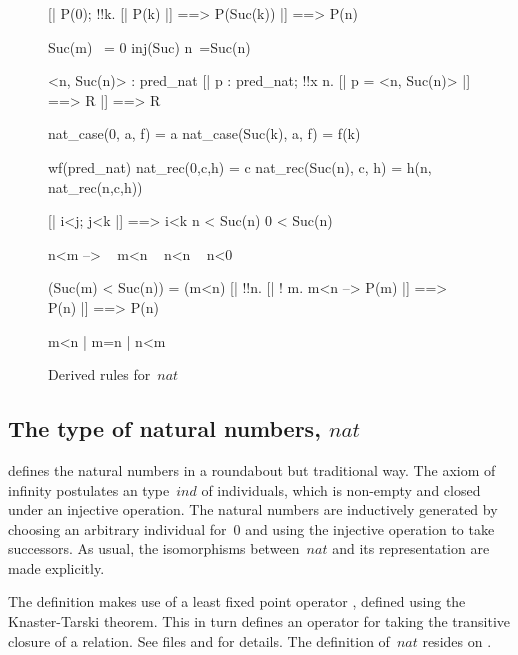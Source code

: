 \begin{figure} \makeatother
\begin{ttbox}
     [| P(0); !!k. [| P(k) |] ==> P(Suc(k)) |]  ==> P(n)

   Suc(m) ~= 0
        inj(Suc)
    n~=Suc(n)

      <n, Suc(n)> : pred_nat
    [| p : pred_nat;  !!x n. [| p = <n, Suc(n)> |] ==> R |] ==> R

     nat_case(0, a, f) = a
   nat_case(Suc(k), a, f) = f(k)

    wf(pred_nat)
      nat_rec(0,c,h) = c
    nat_rec(Suc(n), c, h) = h(n, nat_rec(n,c,h))

     [| i<j;  j<k |] ==> i<k
          n < Suc(n)
  0 < Suc(n)

   n<m --> ~ m<n 
  ~ n<n
      ~ n<0

    (Suc(m) < Suc(n)) = (m<n)
    [| !!n. [| ! m. m<n --> P(m) |] ==> P(n) |]  ==>  P(n)

    m<n | m=n | n<m
\end{ttbox}
\caption{Derived rules for~$nat$} \label{hol-nat2}
\end{figure}


\subsection{The type of natural numbers, $nat$}
{\HOL} defines the natural numbers in a roundabout but traditional way.
The axiom of infinity postulates an type~$ind$ of individuals, which is
non-empty and closed under an injective operation.  The natural numbers are
inductively generated by choosing an arbitrary individual for~0 and using
the injective operation to take successors.  As usual, the isomorphisms
between~$nat$ and its representation are made explicitly.

The definition makes use of a least fixed point operator ,
defined using the Knaster-Tarski theorem.  This in turn defines an operator
 for taking the transitive closure of a relation.  See
files  and  for
details.  The definition of~$nat$ resides on .  

